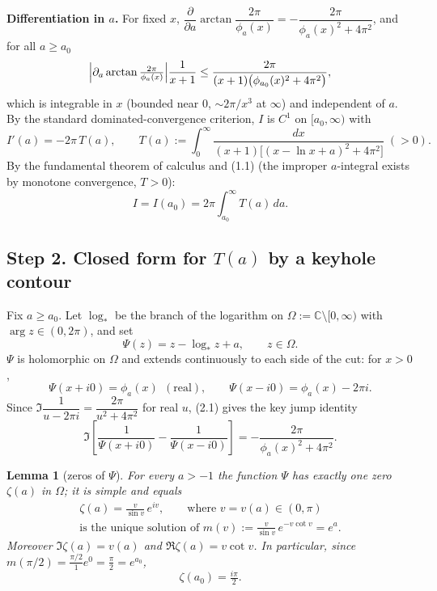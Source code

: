 \documentclass[11pt]{article}
\newtheorem{lemma}{Lemma}
\theoremstyle{remark}
\begin{document}
\textbf{Differentiation in $a$.} For fixed $x$, $\dfrac{\partial}{\partial a}\arctan\dfrac{2\pi}{\phi_a(x)}=-\dfrac{2\pi}{\phi_a(x)^2+4\pi^2}$, and for all $a\ge a_0$
$$\Bigl|\partial_a\arctan\tfrac{2\pi}{\phi_a(x)}\Bigr|\frac{1}{x+1}\le \frac{2\pi}{(x+1)\bigl(\phi_{a_0}(x)^2+4\pi^2\bigr)},$$
which is integrable in $x$ (bounded near $0$, $\sim 2\pi/x^{3}$ at $\infty$) and independent of $a$. By the standard dominated-convergence criterion, $I$ is $C^1$ on $[a_0,\infty)$ with
\begin{equation*}
I'(a)=-2\pi\,T(a),\qquad
T(a):=\int_0^\infty\frac{dx}{(x+1)\bigl[(x-\ln x+a)^2+4\pi^2\bigr]}\;(>0). \tag{1.2}
\end{equation*}
By the fundamental theorem of calculus and (1.1) (the improper $a$-integral exists by monotone convergence, $T>0$):
\begin{equation*}
I=I(a_0)=2\pi\int_{a_0}^{\infty}T(a)\,da. \tag{1.3}
\end{equation*}

\subsection*{Step 2. Closed form for $T(a)$ by a keyhole contour}

Fix $a\ge a_0$. Let $\log_*$ be the branch of the logarithm on $\Omega:=\mathbb{C}\setminus[0,\infty)$ with $\arg z\in(0,2\pi)$, and set
$$\Psi(z)=z-\log_* z+a,\qquad z\in\Omega .$$
$\Psi$ is holomorphic on $\Omega$ and extends continuously to each side of the cut: for $x>0$,
\begin{equation*}
\Psi(x+i0)=\phi_a(x)\ \ (\text{real}),\qquad \Psi(x-i0)=\phi_a(x)-2\pi i . \tag{2.1}
\end{equation*}
Since $\Im\dfrac{1}{u-2\pi i}=\dfrac{2\pi}{u^{2}+4\pi^{2}}$ for real $u$, (2.1) gives the key jump identity
\begin{equation*}
\Im\left[\frac{1}{\Psi(x+i0)}-\frac{1}{\Psi(x-i0)}\right]=-\frac{2\pi}{\phi_a(x)^2+4\pi^2}. \tag{2.2}
\end{equation*}

\begin{lemma}[zeros of $\Psi$]
For every $a>-1$ the function $\Psi$ has exactly one zero $\zeta(a)$ in $\Omega$; it is simple and equals
\begin{multline*}
\zeta(a)=\frac{v}{\sin v}\,e^{iv},\qquad\text{where } v=v(a)\in(0,\pi)\\
\text{is the unique solution of } m(v):=\frac{v}{\sin v}\,e^{-v\cot v}=e^{a}.
\end{multline*}
Moreover $\Im\zeta(a)=v(a)$ and $\Re\zeta(a)=v\cot v$. In particular, since $m(\pi/2)=\frac{\pi/2}{1}e^{0}=\frac\pi2=e^{a_0}$,
\begin{equation*}
\zeta(a_0)=\tfrac{i\pi}{2}. \tag{2.3}
\end{equation*}
\end{lemma}
\end{document}
